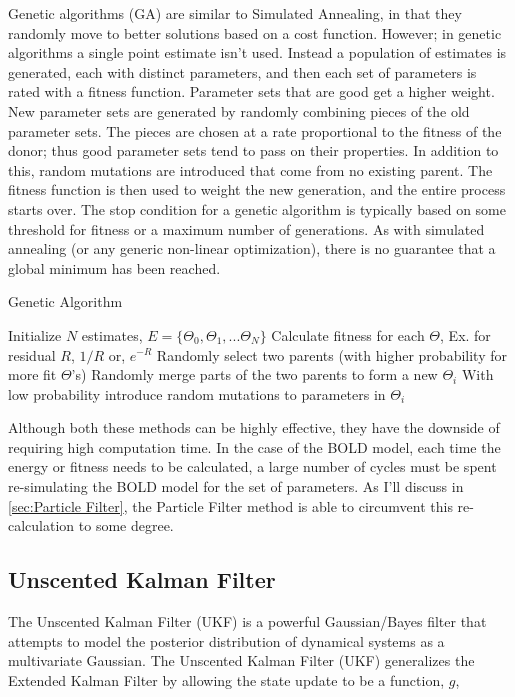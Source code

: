 
Genetic algorithms (GA) are similar to Simulated Annealing, in
that they randomly move to better solutions based on a cost function.
However; in genetic algorithms a single point estimate isn't used. Instead
a population of estimates is generated, each with distinct parameters,
and then each set of parameters is rated with a fitness function. Parameter
sets that are good get a higher weight. New parameter sets are generated by 
randomly combining pieces of the old parameter sets. The pieces are 
chosen at a rate proportional to the fitness of the donor; thus good
parameter sets tend to pass on their properties. In addition to this,
random mutations are introduced that come from no existing parent. 
The fitness function is then used to weight the new generation, and
the entire process starts over. The stop condition for a genetic algorithm
is typically based on some threshold for fitness or a maximum number 
of generations. As with simulated annealing (or any generic non-linear optimization),
there is no guarantee that a global minimum has been reached.

\begin{algorithm}
\caption{Genetic Algorithm}
\label{alg:Genetic Algorithm}
\begin{algorithmic}
\STATE Initialize $N$ estimates, $E = \{\Theta_0, \Theta_1, ... \Theta_N\}$
    \STATE Calculate fitness for each $\Theta$, Ex. for residual $R$, $1/R$ or, $e^{-R}$
        \STATE Randomly select two parents (with higher probability for more fit $\Theta$'s)
        \STATE Randomly merge parts of the two parents to form a new $\Theta_i$
        \STATE With low probability introduce random mutations to parameters in $\Theta_i$
    \ENDFOR
\ENDFOR
\end{algorithmic}
\end{algorithm}

Although both these methods can be highly effective, they have the downside of
requiring high computation time. In the case of the BOLD model,
each time the energy or fitness needs to be calculated, a large number of cycles
must be spent re-simulating the BOLD model for the set of parameters. As I'll
discuss in \autoref{sec:Particle Filter}, the Particle Filter method is able
to circumvent this re-calculation to some degree.

\subsection{Unscented Kalman Filter}
\label{sec:Unscented Kalman Filter}
The Unscented Kalman Filter (UKF) is a powerful Gaussian/Bayes filter that attempts
to model the posterior distribution of dynamical systems as a multivariate
Gaussian. The Unscented Kalman Filter (UKF) generalizes the Extended Kalman
Filter by allowing the state update to be a function, $g$,

